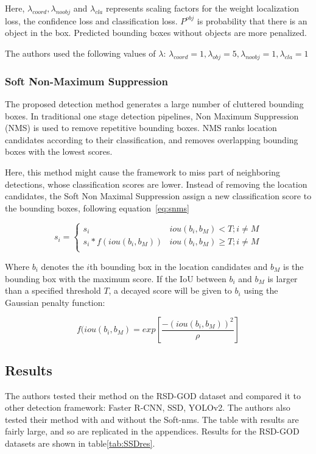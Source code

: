 Here, $\lambda_{coord}, \lambda_{noobj}$ and $\lambda_{cla}$ represents scaling factors for the weight localization loss, the confidence loss and classification loss. $P^{obj}$ is probability that there is an object in the box. Predicted bounding boxes without objects are more penalized. 

The authors used the following values of $\lambda$: $\lambda_{coord} = 1, \lambda_{obj} = 5, \lambda_{noobj} = 1, \lambda_{cla} = 1$
\subsubsection{Soft Non-Maximum Suppression}

The proposed detection method generates a large number of cluttered bounding boxes. In traditional one stage detection pipelines, Non Maximum Suppression (NMS) is used to remove repetitive bounding boxes. NMS ranks location candidates according to their classification, and removes overlapping bounding boxes with the lowest scores. 

Here, this method might cause the framework to miss part of neighboring detections, whose classification scores are lower. Instead of removing the location candidates, the Soft Non Maximal Suppression assign a new classification score to the bounding boxes, following equation~\ref{eq:snms}

\begin{equation}\label{eq:snms}
	s_i =
	      \begin{cases}
		      s_i & iou(b_i, b_M) < T; i \neq M\\
		      s_i * f(iou(b_i, b_M)) & iou(b_i, b_M) \geq T; i \neq M\\
	      \end{cases}  
\end{equation}

Where $b_i$ denotes the $i$th bounding box in the location candidates and $b_M$ is the bounding box with the maximum score. If the IoU between $b_i$ and $b_M$ is larger than a specified threshold $T$, a decayed score will be given to $b_i$ using the Gaussian penalty function:

\begin{equation}
	f(iou(b_i, b_M) = exp[\frac{-(iou(b_i, b_M))^2}{\rho}]
\end{equation}

\subsection{Results}
The authors tested their method on the RSD-GOD dataset and compared it to other detection framework: Faster R-CNN\cite{FasterRCNN}, SSD\cite{ssd}, YOLOv2\cite{yolov9000}. The authors also tested their method with and without the Soft-\gls{nms}. The table with results are fairly large, and so are replicated in the appendices. Results for the RSD-GOD datasets are shown in table\ref{tab:SSDres}.

